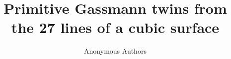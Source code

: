 \documentclass[11pt,reqno]{amsart}
\title[Primitive Gassmann twins]{Primitive Gassmann twins from the 27 lines of a cubic surface}
\author{Anonymous Authors}
\date{}
\theoremstyle{definition}
\theoremstyle{remark}
\numberwithin{equation}{section}
\begin{document}
\raggedbottom

\begin{abstract}

\end{abstract}

\maketitle










\appendix









\end{document}
